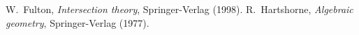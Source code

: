 \documentclass[12pt]{amsart}
\theoremstyle{definition}
\theoremstyle{property}
\renewcommand\_{^{}_}
\begin{document}
\begin{thebibliography}{MNOP2}
 W.~Fulton, \textit{Intersection theory}, Springer-Verlag (1998).
 R.~Hartshorne, \textit{Algebraic geometry}, Springer-Verlag (1977).

\end{thebibliography}
\end{document}
